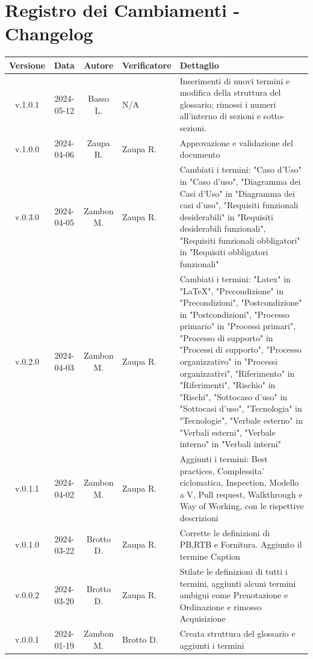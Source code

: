 \documentclass[12pt, oneside]{article}
\begin{document}
\section*{Registro dei Cambiamenti - Changelog}
\begin{tabular}{|c|c|c|p{3cm}|p{6cm}|}
\hline
\textbf{Versione} & \textbf{Data} & \textbf{Autore} & \textbf{Verificatore} & \textbf{Dettaglio} \\
\hline
v.1.0.1 & 2024-05-12 & Basso L. & N/A & Inserimenti di nuovi termini e modifica della struttura del glossario; rimossi i numeri all'interno di sezioni e sotto-sezioni.\\
\hline
v.1.0.0 & 2024-04-06 & Zaupa R. & Zaupa R. & Approvazione e validazione del documento\\
\hline
v.0.3.0 & 2024-04-05 & Zambon M. & Zaupa R. & Cambiati i termini: "Caso d'Uso" in "Caso d'uso", "Diagramma dei Casi d'Uso" in "Diagramma dei casi d'uso", "Requisiti funzionali desiderabili" in "Requisiti desiderabili funzionali", "Requisiti funzionali obbligatori" in "Requisiti obbligatori funzionali"\\
\hline
v.0.2.0 & 2024-04-03 & Zambon M. & Zaupa R. & Cambiati i termini: "Latex" in "LaTeX", "Precondizione" in "Precondizioni", "Postcondizione" in "Postcondizioni", "Processo primario" in "Processi primari", "Processo di supporto" in "Processi di supporto", "Processo organizzativo" in "Processi organizzativi", "Riferimento" in "Riferimenti", "Rischio" in "Rischi", "Sottocaso d'uso" in "Sottocasi d'uso", "Tecnologia" in "Tecnologie", "Verbale esterno" in "Verbali esterni", "Verbale interno" in "Verbali interni"\\
\hline
v.0.1.1 & 2024-04-02 & Zambon M. & Zaupa R. & Aggiunti i termini: Best practices, Complessita' ciclomatica, Inspection, Modello a V, Pull request, Walkthrough e Way of Working, con le rispettive descrizioni\\
\hline
v.0.1.0 & 2024-03-22 & Brotto D. & Zaupa R. & Corrette le definizioni di PB,RTB e Fornitura. Aggiunto il termine Caption\\
\hline
v.0.0.2 & 2024-03-20 & Brotto D. & Zaupa R. & Stilate le definizioni di tutti i termini, aggiunti alcuni termini ambigui come Prenotazione e Ordinazione e rimosso Acquisizione \\
\hline
v.0.0.1 & 2024-01-19 & Zambon M. & Brotto D. & Creata struttura del glossario e aggiunti i termini \\
\hline
\end{tabular}
\newpage
\end{document}
